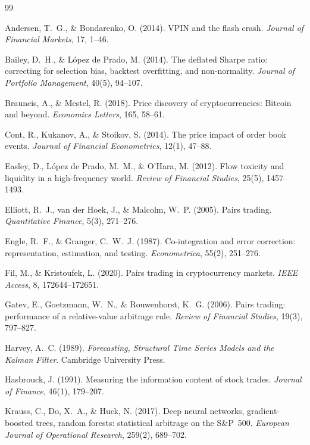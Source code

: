 \documentclass[11pt]{article}
\begin{document}
\begin{thebibliography}{99}

Andersen, T.~G., \& Bondarenko, O. (2014). VPIN and the flash crash.
\emph{Journal of Financial Markets}, 17, 1--46.

Bailey, D.~H., \& L\'opez de Prado, M. (2014). The deflated Sharpe ratio: correcting for
selection bias, backtest overfitting, and non-normality. \emph{Journal of Portfolio
Management}, 40(5), 94--107.

Brauneis, A., \& Mestel, R. (2018). Price discovery of cryptocurrencies: Bitcoin and beyond.
\emph{Economics Letters}, 165, 58--61.

Cont, R., Kukanov, A., \& Stoikov, S. (2014). The price impact of order book events.
\emph{Journal of Financial Econometrics}, 12(1), 47--88.

Easley, D., L\'opez de Prado, M.~M., \& O'Hara, M. (2012). Flow toxicity and liquidity
in a high-frequency world. \emph{Review of Financial Studies}, 25(5), 1457--1493.

Elliott, R.~J., van der Hoek, J., \& Malcolm, W.~P. (2005). Pairs trading.
\emph{Quantitative Finance}, 5(3), 271--276.

Engle, R.~F., \& Granger, C.~W.~J. (1987). Co-integration and error correction:
representation, estimation, and testing. \emph{Econometrica}, 55(2), 251--276.

Fil, M., \& Kristoufek, L. (2020). Pairs trading in cryptocurrency markets.
\emph{IEEE Access}, 8, 172644--172651.

Gatev, E., Goetzmann, W.~N., \& Rouwenhorst, K.~G. (2006). Pairs trading: performance of a
relative-value arbitrage rule. \emph{Review of Financial Studies}, 19(3), 797--827.

Harvey, A.~C. (1989). \emph{Forecasting, Structural Time Series Models and the
Kalman Filter}. Cambridge University Press.

Hasbrouck, J. (1991). Measuring the information content of stock trades.
\emph{Journal of Finance}, 46(1), 179--207.

Krauss, C., Do, X.~A., \& Huck, N. (2017). Deep neural networks, gradient-boosted trees,
random forests: statistical arbitrage on the S\&P~500. \emph{European Journal of
Operational Research}, 259(2), 689--702.


\end{thebibliography}
\end{document}
